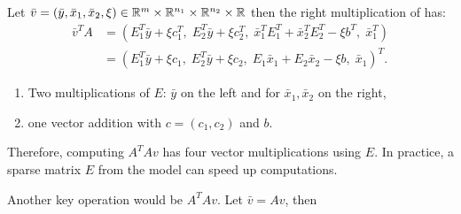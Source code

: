 \documentclass[12pt]{report}
\begin{document}
        Let $\bar v = (\bar y, \bar x_1, \bar x_2, \xi) \in \mathbb R^m\times \mathbb R^{n_1} \times \mathbb R^{n_2}\times \mathbb R$ then the right multiplication of has: 
        \begin{align*}
            \bar v^TA  &= (
                E_1^T\bar y + \xi c_1^T,\; E_2^T\bar y + \xi c_2^T,\; 
                \bar x_1^TE_1^T + \bar x_2^TE_2^T - \xi b^T,\; \bar x_1^T
            )
            \\
            &= 
            (
                E_1^T\bar y + \xi c_1, \;
                E_2^T \bar y + \xi c_2, \;
                E_1\bar x_1 + E_2\bar x_2 - \xi b, \;
                \bar x_1
            )^T. 
        \end{align*}
        \begin{enumerate}
            \item Two multiplications of $E$: $\bar y$ on the left and for $\bar x_1, \bar x_2$ on the right, 
            \item one vector addition with $c = (c_1, c_2)$ and $b$. 
        \end{enumerate}
        Therefore, computing $A^TAv$ has four vector multiplications using $E$. 
        In practice, a sparse matrix $E$ from the model can speed up computations. 
        \par
        Another key operation would be $A^TAv$. 
        Let $\bar v = Av$, then 
\end{document}
